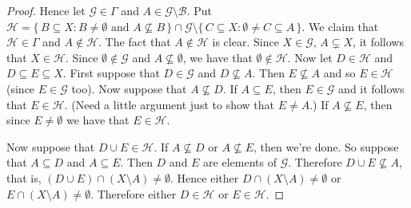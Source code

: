 \documentclass[12pt]{article}
\theoremstyle{plain}
\theoremstyle{definition}
\newcommand{\calB}{\mathcal{B}}
\newcommand{\calG}{\mathcal{G}}
\newcommand{\calH}{\mathcal{H}}
\begin{document}
\begin{proof}
  Hence let $\calG \in \Gamma$ and $A \in \calG \setminus \calB$.
  Put $\calH = \{\, B \subseteq X : B \ne \emptyset \mbox{ and } A
  \not\subseteq B \,\} \cap \calG \setminus \{\, C \subseteq X : \emptyset \ne C
  \subseteq A \,\}$.
  We claim that $\calH \in \Gamma$  and $A \not\in \calH$. 
  The fact that $A \not\in \calH$ is clear. 
  Since $X \in \calG$, $A \subsetneq X$, it follows that $X \in
  \calH$. 
  Since $\emptyset \not\in \calG$ and $A \not\subseteq \emptyset$, we
  have that $\emptyset \not\in \calH$. 
  Now let $D \in \calH$ and $D \subseteq E \subseteq X$. 
  First suppose that $D \in \calG$ and $D \not\subseteq A$.
  Then $E \not\subseteq A$ and so $E \in \calH$ (since $E \in \calG$
  too).
  Now suppose that $A \not\subseteq D$. 
  If $A \subseteq E$, then $E \in \calG$ and it follows that $E \in
  \calH$. 
  (Need a little argument just to show that $E \ne A$.)
  If $A \not\subseteq E$, then since $E \ne \emptyset$ we have that $E
  \in \calH$.

  Now suppose that $D \cup E \in \calH$. 
  If $A \not\subseteq D$ or $A \not\subseteq E$, then we're done.
  So suppose that $A \subseteq D$ and $A \subseteq E$.
  Then $D$ and $E$ are elements of $\calG$. 
  Therefore $D \cup E \not\subseteq A$, that is, $(D \cup E) \cap (X
  \setminus A) \ne \emptyset$. 
  Hence either $D \cap (X \setminus A) \ne \emptyset$ or $E \cap (X
  \setminus A) \ne \emptyset$.
  Therefore either $D \in \calH$ or $E \in \calH$.
\end{proof}
\end{document}
